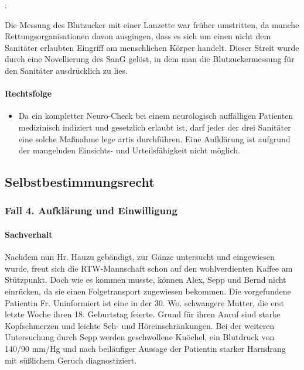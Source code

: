 :

{\mdseries
Die Messung des Blutzucker mit einer Lanzette war fr\"uher umstritten,
da manche Rettungsorganisationen davon ausgingen, dass es sich um einen
nicht dem Sanitäter erlaubten Eingriff am menschlichen K\"orper
handelt. Dieser Streit wurde durch eine Novellierung des SanG gel\"ost,
in dem man die Blutzuckermessung f\"ur den Sanitäter ausdr\"ucklich
zu lies.}

\paragraph*{Rechtsfolge}
\begin{itemize}
	\item {\mdseries\color[rgb]{0.0,0.0,0.5019608}
	Da ein kompletter Neuro-Check bei einem neurologisch
	auffälligen Patienten medizinisch indiziert und
	gesetzlich erlaubt ist, darf jeder der drei Sanitäter eine solche Ma{\ss}nahme lege artis durchf\"uhren. Eine
	Aufklärung ist aufgrund der mangelnden Einsichts- und
	Urteilsfähigkeit nicht m\"oglich.}
\end{itemize}
\subsection{Selbstbestimmungsrecht}

\subsubsection{Fall 4. Aufklärung und Einwilligung}

\paragraph*{Sachverhalt}

Nachdem nun Hr. Hauzu gebändigt, zur Gänze untersucht und
eingewiesen wurde, freut sich die RTW-Mannschaft schon auf den
wohlverdienten Kaffee am St\"utzpunkt. Doch wie es kommen musste,
k\"onnen Alex, Sepp und Bernd nicht einr\"ucken, da sie einen
Folgetransport zugewiesen bekommen. Die vorgefundene
Patientin Fr. Uninformiert ist eine in der 30. Wo.
schwangere Mutter, die erst letzte Woche ihren 18. Geburtstag feierte. Grund f\"ur ihren Anruf sind starke
Kopfschmerzen und leichte Seh- und H\"oreinschränkungen. Bei der
weiteren Untersuchung durch Sepp werden geschwollene Kn\"ochel, ein
Blutdruck von 140/90 mm/Hg und nach beiläufiger Aussage der
Patientin starker Harndrang mit s\"u{\ss}lichem Geruch
diagnostiziert.

